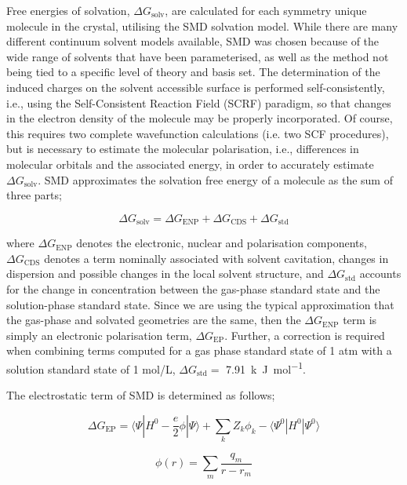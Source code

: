 \documentclass[twoside,twocolumn,9pt]{article}
\begin{document}
Free energies of solvation, $\Delta G_{\textrm{solv}}$, are calculated for each symmetry unique molecule in the crystal, utilising the SMD solvation model.\cite{Marenich2009} While there are many different continuum solvent models available, SMD was chosen because of the wide range of solvents that have been parameterised, as well as the method not being tied to a specific level of theory and basis set. The determination of the induced charges on the solvent accessible surface is performed self-consistently, i.e., using the Self-Consistent Reaction Field (SCRF) paradigm, so that changes in the electron density of the molecule may be properly incorporated. Of course, this requires two complete wavefunction calculations (i.e. two SCF procedures), but is necessary to estimate the molecular polarisation, i.e., differences in molecular orbitals and the associated energy, in order to accurately estimate $\Delta G_{\textrm{solv}}$. SMD approximates the solvation free energy of a molecule as the sum of three parts;

\begin{equation}
    \Delta G_{\text{solv}} = \Delta G_{\text{ENP}} + \Delta G_{\text{CDS}} + \Delta G_{\text{std}}
\end{equation}

where $\Delta G_{\textrm{ENP}}$ denotes the electronic, nuclear and polarisation components, $\Delta G_{\text{CDS}}$ 
denotes a term nominally associated with solvent cavitation, changes in dispersion and possible changes in the local solvent structure, and $\Delta G_{\text{std}}$ accounts for the change in concentration between the gas-phase standard state and the solution-phase standard state. Since we are using the typical approximation that the gas-phase and solvated geometries are the same, then the $\Delta G_{\text{ENP}}$ term is simply an electronic polarisation term, $\Delta G_{\textrm{EP}}$. 
Further, a correction is required when combining terms computed for a gas phase standard state of 1 atm with a solution standard state of 1 mol/L,  $\Delta G_{\text{std}} =$ \qty{7.91}{k.J.mol^{-1}}.

The electrostatic term of SMD is determined as follows;

\begin{equation}
\Delta G_{\text{EP}} = \langle \Psi | H^0 -\frac{e}{2} \phi | \Psi \rangle + \sum_k Z_k \phi_k - \langle \Psi^0 | H^0 | \Psi^0 \rangle
\label{eqn:deltaG_EP}
\end{equation}

\begin{equation}
\phi(r) = \sum_m \frac{q_m}{r - r_m}
\end{equation}
\end{document}
